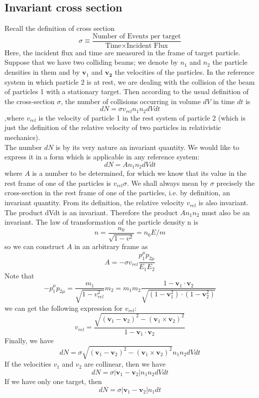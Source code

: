 \subsection{Invariant cross section}
Recall the definition of cross section
\[\sigma \equiv \frac{\mbox{Number of Events per target}}{\mbox{Time} \times \mbox{Incident Flux}}\]
Here, the incident flux and time are measured in the frame of target particle.\\
Suppose that we have two colliding beams; we denote by $n_1$ and $n_2$ the particle densities in them and by $\bm{v}_1$ and $\bm{v_2}$ the velocities of the particles. In the reference system in which particle 2 is at rest, we are dealing with the collision of the beam of particles 1 with a stationary target. Then according to the usual definition of the cross-section $\sigma$, the number of collisions occurring in volume $dV$ in time $dt$ is 
\[dN = \sigma v_{rel} n_1 n_2 dV dt\]
,where $v_{rel}$ is the velocity of particle 1 in the rest system of particle 2 (which is just the definition of the relative velocity of two particles in relativistic mechanics). \\
The number $dN$ is by its very nature an invariant quantity. We would like to express it in a form which is applicable in any reference system: 
\[dN = A n_1 n_2 dV dt\] 
where $A$ is a number to be determined, for which we know that its value in the rest frame of one of the particles is $v_{rel} \sigma$. We shall always mean by $\sigma$ precisely the cross-section in the rest frame of one of the particles, i.e. by definition, an invariant quantity. From its definition, the relative velocity $v_{rel}$ is also invariant. The product dVdt is an invariant. Therefore the product $A n_1 n_2$ must also be an invariant. The law of transformation of the particle density n is
\[n = \frac{n_0}{\sqrt{1-v^2}} = n_0 E/m\]
so we can construct $A$ in an arbitrary frame as
\[A = -\sigma v_{rel} \frac{p_1^{\mu}p_{2\mu}}{E_1 E_2}\]
Note that
\[-p_1^{\mu}p_{2\mu} = \frac{m_1}{\sqrt{1-v_{rel}^2}}m_2 = m_1 m_2 \frac{1-\bm{v}_1\cdot\bm{v}_2}{\sqrt{(1-\bm{v}_1^2)\cdot(1-\bm{v}_2^2)}}\]
we can get the following expression for $v_{rel}$:
\[v_{rel} = \frac{\sqrt{(\bm{v}_1-\bm{v}_2)^2-(\bm{v}_1\times\bm{v}_2)^2}}{1-\bm{v}_1\cdot\bm{v}_2}\]
Finally, we have
\[dN = \sigma \sqrt{(\bm{v}_1-\bm{v}_2)^2-(\bm{v}_1\times\bm{v}_2)^2} n_1 n_2 dV dt\]
If the velocities $v_1$ and $v_2$ are collinear, then we have
\[dN = \sigma |\bm{v}_1 - \bm{v}_2| n_1 n_2 dV dt\]
If we have only one target, then
\[dN = \sigma |\bm{v}_1 - \bm{v}_2| n_1 dt\]

